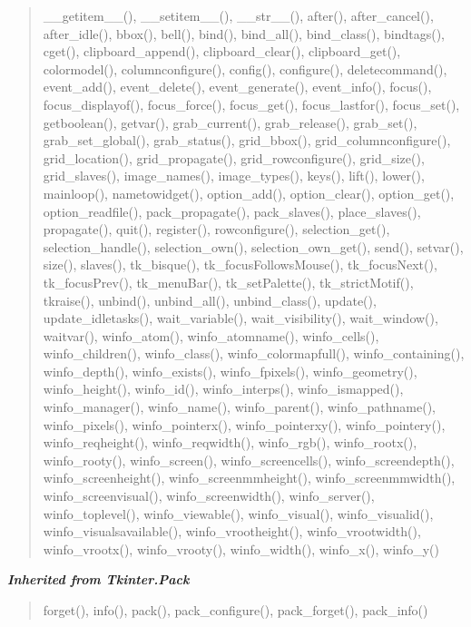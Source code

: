 \begin{quote}
\_\_getitem\_\_(), \_\_setitem\_\_(), \_\_str\_\_(), after(), after\_cancel(), after\_idle(), bbox(), bell(), bind(), bind\_all(), bind\_class(), bindtags(), cget(), clipboard\_append(), clipboard\_clear(), clipboard\_get(), colormodel(), columnconfigure(), config(), configure(), deletecommand(), event\_add(), event\_delete(), event\_generate(), event\_info(), focus(), focus\_displayof(), focus\_force(), focus\_get(), focus\_lastfor(), focus\_set(), getboolean(), getvar(), grab\_current(), grab\_release(), grab\_set(), grab\_set\_global(), grab\_status(), grid\_bbox(), grid\_columnconfigure(), grid\_location(), grid\_propagate(), grid\_rowconfigure(), grid\_size(), grid\_slaves(), image\_names(), image\_types(), keys(), lift(), lower(), mainloop(), nametowidget(), option\_add(), option\_clear(), option\_get(), option\_readfile(), pack\_propagate(), pack\_slaves(), place\_slaves(), propagate(), quit(), register(), rowconfigure(), selection\_get(), selection\_handle(), selection\_own(), selection\_own\_get(), send(), setvar(), size(), slaves(), tk\_bisque(), tk\_focusFollowsMouse(), tk\_focusNext(), tk\_focusPrev(), tk\_menuBar(), tk\_setPalette(), tk\_strictMotif(), tkraise(), unbind(), unbind\_all(), unbind\_class(), update(), update\_idletasks(), wait\_variable(), wait\_visibility(), wait\_window(), waitvar(), winfo\_atom(), winfo\_atomname(), winfo\_cells(), winfo\_children(), winfo\_class(), winfo\_colormapfull(), winfo\_containing(), winfo\_depth(), winfo\_exists(), winfo\_fpixels(), winfo\_geometry(), winfo\_height(), winfo\_id(), winfo\_interps(), winfo\_ismapped(), winfo\_manager(), winfo\_name(), winfo\_parent(), winfo\_pathname(), winfo\_pixels(), winfo\_pointerx(), winfo\_pointerxy(), winfo\_pointery(), winfo\_reqheight(), winfo\_reqwidth(), winfo\_rgb(), winfo\_rootx(), winfo\_rooty(), winfo\_screen(), winfo\_screencells(), winfo\_screendepth(), winfo\_screenheight(), winfo\_screenmmheight(), winfo\_screenmmwidth(), winfo\_screenvisual(), winfo\_screenwidth(), winfo\_server(), winfo\_toplevel(), winfo\_viewable(), winfo\_visual(), winfo\_visualid(), winfo\_visualsavailable(), winfo\_vrootheight(), winfo\_vrootwidth(), winfo\_vrootx(), winfo\_vrooty(), winfo\_width(), winfo\_x(), winfo\_y()
\end{quote}

\large{\textbf{\textit{Inherited from Tkinter.Pack}}}

\begin{quote}
forget(), info(), pack(), pack\_configure(), pack\_forget(), pack\_info()
\end{quote}

